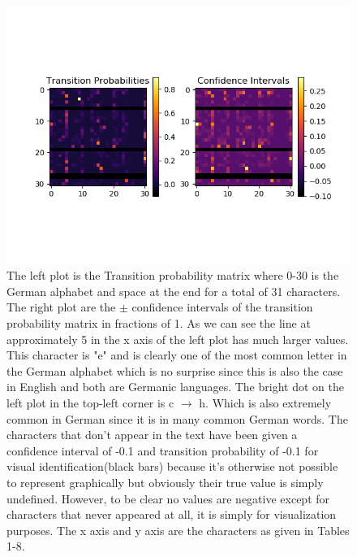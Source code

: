 \documentclass[11pt,a4paper]{CLabBookTemplate} %
\begin{document}
\begin{figure}[h!]
	\centering
	\includegraphics[width = 160mm]{Figures/Figure1.png}
	\caption{The left plot is the Transition probability matrix where 0-30 is the German alphabet and space at the end for a total of 31 characters. The right plot are the $\pm$ confidence intervals of the transition probability matrix in fractions of 1. As we can see the line at approximately 5 in the x axis of the left plot has much larger values. This character is "e" and is clearly one of the most common letter in the German alphabet which is no surprise since this is also the case in English and both are Germanic languages. The bright dot on the left plot in the top-left corner is c $\rightarrow$ h. Which is also extremely common in German since it is in many common German words. The characters that don't appear in the text have been given a confidence interval of -0.1 and transition probability of -0.1 for visual identification(black bars) because it's otherwise not possible to represent graphically but obviously their true value is simply undefined. However, to be clear no values are negative except for characters that never appeared at all, it is simply for visualization purposes. The x axis and y axis are the characters as given in Tables 1-8.}
	\label{fig:Figure1}
\end{figure}
\end{document}
